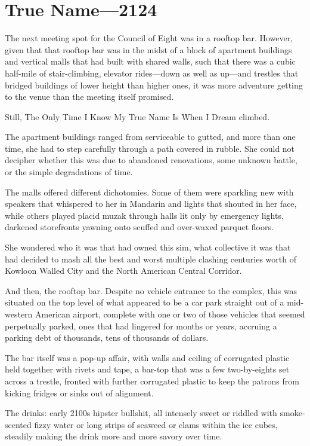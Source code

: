 \hypertarget{true-name-2124}{%
\chapter{True Name—2124}\label{true-name-2124}}

The next meeting spot for the Council of Eight was in a rooftop bar. However, given that that rooftop bar was in the midst of a block of apartment buildings and vertical malls that had built with shared walls, such that there was a cubic half-mile of stair-climbing, elevator rides---down as well as up---and trestles that bridged buildings of lower height than higher ones, it was more adventure getting to the venue than the meeting itself promised.

Still, The Only Time I Know My True Name Is When I Dream climbed.

The apartment buildings ranged from serviceable to gutted, and more than one time, she had to step carefully through a path covered in rubble. She could not decipher whether this was due to abandoned renovations, some unknown battle, or the simple degradations of time.

The malls offered different dichotomies. Some of them were sparkling new with speakers that whispered to her in Mandarin and lights that shouted in her face, while others played placid muzak through halls lit only by emergency lights, darkened storefronts yawning onto scuffed and over-waxed parquet floors.

She wondered who it was that had owned this sim, what collective it was that had decided to mash all the best and worst multiple clashing centuries worth of Kowloon Walled City and the North American Central Corridor.

And then, the rooftop bar. Despite no vehicle entrance to the complex, this was situated on the top level of what appeared to be a car park straight out of a mid-western American airport, complete with one or two of those vehicles that seemed perpetually parked, ones that had lingered for months or years, accruing a parking debt of thousands, tens of thousands of dollars.

The bar itself was a pop-up affair, with walls and ceiling of corrugated plastic held together with rivets and tape, a bar-top that was a few two-by-eights set across a trestle, fronted with further corrugated plastic to keep the patrons from kicking fridges or sinks out of alignment.

The drinks: early 2100s hipster bullshit, all intensely sweet or riddled with smoke-scented fizzy water or long strips of seaweed or clams within the ice cubes, steadily making the drink more and more savory over time.

